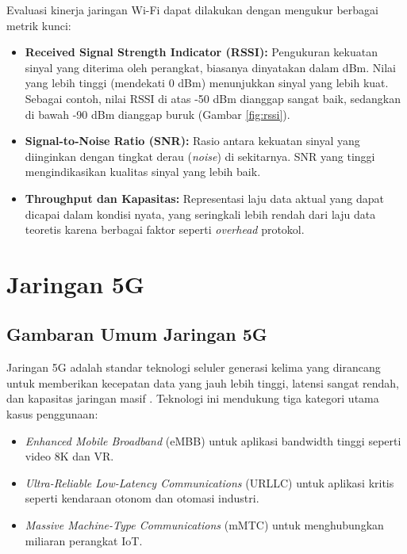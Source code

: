 Evaluasi kinerja jaringan Wi-Fi dapat dilakukan dengan mengukur berbagai metrik kunci:
\begin{itemize}
    \item \textbf{Received Signal Strength Indicator (RSSI):} Pengukuran kekuatan sinyal yang diterima oleh perangkat, biasanya dinyatakan dalam dBm. Nilai yang lebih tinggi (mendekati 0 dBm) menunjukkan sinyal yang lebih kuat. Sebagai contoh, nilai RSSI di atas -50 dBm dianggap sangat baik, sedangkan di bawah -90 dBm dianggap buruk (Gambar \ref{fig:rssi}). \cite{ttn_rssi_snr}
    \item \textbf{Signal-to-Noise Ratio (SNR):} Rasio antara kekuatan sinyal yang diinginkan dengan tingkat derau (\textit{noise}) di sekitarnya. SNR yang tinggi mengindikasikan kualitas sinyal yang lebih baik.
    \item \textbf{Throughput dan Kapasitas:} Representasi laju data aktual yang dapat dicapai dalam kondisi nyata, yang seringkali lebih rendah dari laju data teoretis karena berbagai faktor seperti \textit{overhead} protokol.
\end{itemize}



\section{Jaringan 5G}

\subsection{Gambaran Umum Jaringan 5G}
Jaringan 5G adalah standar teknologi seluler generasi kelima yang dirancang untuk memberikan kecepatan data yang jauh lebih tinggi, latensi sangat rendah, dan kapasitas jaringan masif \cite{qualcomm_5g_overview}. Teknologi ini mendukung tiga kategori utama kasus penggunaan: 

\begin{itemize}
    \item \textit{Enhanced Mobile Broadband} (eMBB) untuk aplikasi bandwidth tinggi seperti video 8K dan VR.
    \item \textit{Ultra-Reliable Low-Latency Communications} (URLLC) untuk aplikasi kritis seperti kendaraan otonom dan otomasi industri.
    \item \textit{Massive Machine-Type Communications} (mMTC) untuk menghubungkan miliaran perangkat IoT.\cite{etsi_5g_use_cases}
\end{itemize}

